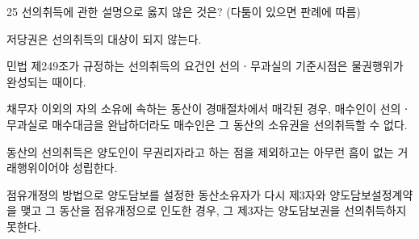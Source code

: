 \begin{question}{25}
선의취득에 관한 설명으로 옳지 않은 것은? (다툼이 있으면 판례에 따름)
\begin{choices}
  \item 저당권은 선의취득의 대상이 되지 않는다.
  \item 민법 제249조가 규정하는 선의취득의 요건인 선의ㆍ무과실의 기준시점은 물권행위가 완성되는 때이다.
  \item 채무자 이외의 자의 소유에 속하는 동산이 경매절차에서 매각된 경우, 매수인이 선의ㆍ무과실로 매수대금을 완납하더라도 매수인은 그 동산의 소유권을 선의취득할 수 없다.
  \item 동산의 선의취득은 양도인이 무권리자라고 하는 점을 제외하고는 아무런 흠이 없는 거래행위이어야 성립한다.
  \item 점유개정의 방법으로 양도담보를 설정한 동산소유자가 다시 제3자와 양도담보설정계약을 맺고 그 동산을 점유개정으로 인도한 경우, 그 제3자는 양도담보권을 선의취득하지 못한다.
\end{choices}
\end{question}
